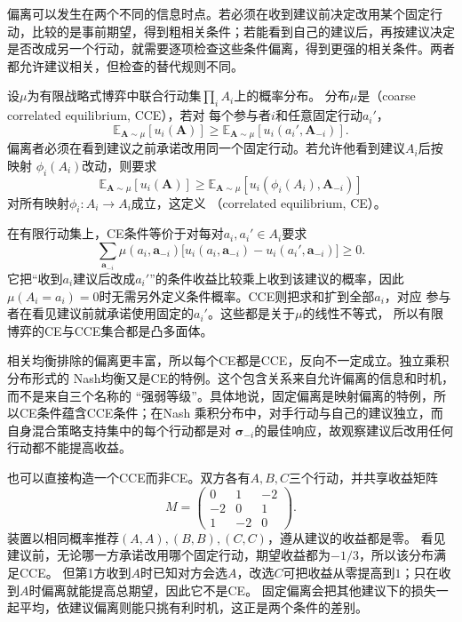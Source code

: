 偏离可以发生在两个不同的信息时点。若必须在收到建议前决定改用某个固定行动，比较的是事前期望，得到粗相关条件；若能看到自己的建议后，再按建议决定是否改成另一个行动，就需要逐项检查这些条件偏离，得到更强的相关条件。两者都允许建议相关，但检查的替代规则不同。
\begin{definition}[粗相关均衡与相关均衡]
\label{def:game-coarse-correlated-equilibrium}
设$\mu$为有限战略式博弈中联合行动集$\prod_i A_i$上的概率分布。
分布\(\mu\)是（coarse correlated equilibrium, CCE），若对
每个参与者\(i\)和任意固定行动\(a_i'\)，
\begin{equation}
  \mathbb{E}_{\bm{A}\sim\mu}[u_i(\bm{A})]
  \geq
  \mathbb{E}_{\bm{A}\sim\mu}
  [u_i(a_i',\bm{A}_{-i})].
  \label{eq:game-cce}
\end{equation}
偏离者必须在看到建议之前承诺改用同一个固定行动。若允许他看到建议\(A_i\)后按映射
\(\phi_i(A_i)\)改动，则要求
\begin{equation}
  \mathbb{E}_{\bm{A}\sim\mu}[u_i(\bm{A})]
  \geq
  \mathbb{E}_{\bm{A}\sim\mu}
  [u_i(\phi_i(A_i),\bm{A}_{-i})]
  \label{eq:game-correlated-equilibrium}
\end{equation}
对所有映射\(\phi_i:A_i\to A_i\)成立，这定义
（correlated equilibrium, CE）。
\end{definition}

在有限行动集上，CE条件等价于对每对\(a_i,a_i'\in A_i\)要求
\begin{equation}
  \sum_{\bm{a}_{-i}}
  \mu(a_i,\bm{a}_{-i})
  \bigl[
    u_i(a_i,\bm{a}_{-i})
    -
    u_i(a_i',\bm{a}_{-i})
  \bigr]
  \geq0.
  \label{eq:game-ce-linear-constraints}
\end{equation}
它把“收到\(a_i\)建议后改成\(a_i'\)”的条件收益比较乘上收到该建议的概率，因此
\(\mu(A_i=a_i)=0\)时无需另外定义条件概率。CCE则把求和扩到全部\(a_i\)，对应
参与者在看见建议前就承诺使用固定的\(a_i'\)。这些都是关于\(\mu\)的线性不等式，
所以有限博弈的CE与CCE集合都是凸多面体。

相关均衡排除的偏离更丰富，所以每个CE都是CCE，反向不一定成立。独立乘积分布形式的
Nash均衡又是CE的特例。这个包含关系来自允许偏离的信息和时机，而不是来自三个名称的
“强弱等级”。具体地说，固定偏离是映射偏离的特例，所以CE条件蕴含CCE条件；在Nash
乘积分布中，对手行动与自己的建议独立，而自身混合策略支持集中的每个行动都是对
\(\bm{\sigma}_{-i}\)的最佳响应，故观察建议后改用任何行动都不能提高收益。

也可以直接构造一个CCE而非CE。双方各有$A,B,C$三个行动，并共享收益矩阵
\[
 M=\begin{pmatrix}0&1&-2\\-2&0&1\\1&-2&0\end{pmatrix}.
\]
装置以相同概率推荐$(A,A),(B,B),(C,C)$，遵从建议的收益都是零。
看见建议前，无论哪一方承诺改用哪个固定行动，期望收益都为$-1/3$，所以该分布满足CCE。
但第1方收到$A$时已知对方会选$A$，改选$C$可把收益从零提高到$1$；只在收到$A$时偏离就能提高总期望，因此它不是CE。
固定偏离会把其他建议下的损失一起平均，依建议偏离则能只挑有利时机，这正是两个条件的差别。

